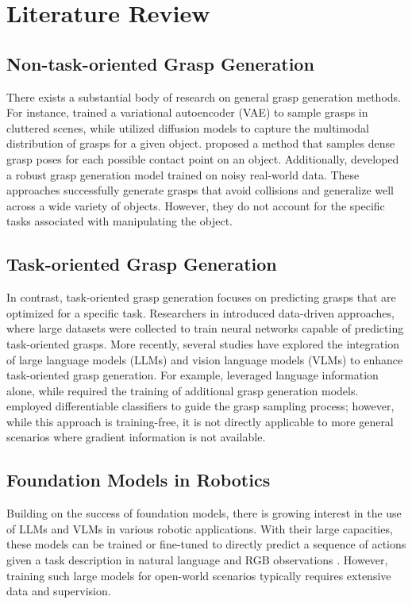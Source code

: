 \section{Literature Review}
\label{review} \subsection{Non-task-oriented Grasp Generation} 
There exists a substantial body of research on general grasp generation methods. For instance, \cite{mousavian20196} trained a variational autoencoder (VAE) to sample grasps in cluttered scenes, while \cite{urain2023se} utilized diffusion models to capture the multimodal distribution of grasps for a given object. \cite{sundermeyer2021contact} proposed a method that samples dense grasp poses for each possible contact point on an object. Additionally, \cite{fang2023anygrasp} developed a robust grasp generation model trained on noisy real-world data. These approaches successfully generate grasps that avoid collisions and generalize well across a wide variety of objects. However, they do not account for the specific tasks associated with manipulating the object.

\subsection{Task-oriented Grasp Generation} 
In contrast, task-oriented grasp generation focuses on predicting grasps that are optimized for a specific task. Researchers in \cite{murali2021same, jang2017end} introduced data-driven approaches, where large datasets were collected to train neural networks capable of predicting task-oriented grasps. More recently, several studies have explored the integration of large language models (LLMs) and vision language models (VLMs) to enhance task-oriented grasp generation. For example, \cite{tang2023task, li2024semgrasp} leveraged language information alone, while \cite{chang2024text2grasp} required the training of additional grasp generation models. \cite{taunyazov2023grace} employed differentiable classifiers to guide the grasp sampling process; however, while this approach is training-free, it is not directly applicable to more general scenarios where gradient information is not available.

\subsection{Foundation Models in Robotics} 
Building on the success of foundation models, there is growing interest in the use of LLMs and VLMs in various robotic applications. With their large capacities, these models can be trained or fine-tuned to directly predict a sequence of actions given a task description in natural language and RGB observations \cite{liu2024moka, team2024octo, brohan2023rt}. However, training such large models for open-world scenarios typically requires extensive data and supervision.

